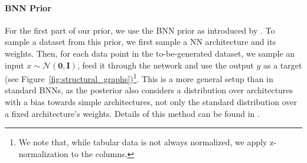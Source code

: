 \documentclass{article}
\begin{document}
\paragraph{BNN Prior}
\label{sec:bnn prior}
For the first part of our prior, we use the BNN prior as introduced by \citet{muller-iclr2022}.
To sample a dataset from this prior, we first sample a 
NN architecture and its weights.
Then, for each data point in the to-be-generated dataset, we sample an input $x \sim \mathcal{N}(\mathbf{0},\mathbf{I})$,
feed it through the network and use the output $y$ as a target (see Figure~\ref{fig:structural_graphs})\footnote{We note that, while tabular data is not always normalized, we apply z-normalization to the columns.}.
This is a more general setup than in standard BNNs, as the posterior also considers a distribution over architectures with a bias towards simple architectures, not only the standard distribution over a fixed architecture's weights.
Details of this method can be found in \citet{muller-iclr2022}.
\end{document}
